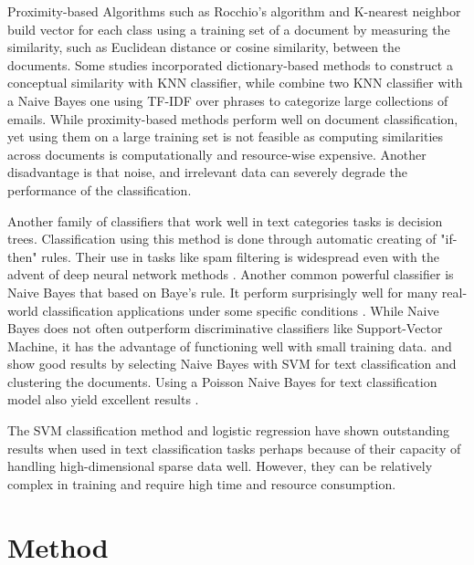 Proximity-based Algorithms such as Rocchio's algorithm \citep{rocchio1971relevance}  and K-nearest neighbor \citep{tam_comparative_2002} build vector for each class using a training set of a document by measuring the similarity, such as Euclidean distance or cosine similarity, between the documents. Some studies \citep{bang_hierarchical_2006} incorporated dictionary-based methods to construct a conceptual similarity with KNN classifier, while \citep{chang_using_2009} combine two KNN classifier with a Naive Bayes one using TF-IDF over phrases to categorize large collections of emails. While proximity-based methods perform well on document classification, yet using them on a large training set is not feasible as computing similarities across documents is computationally and resource-wise expensive. Another disadvantage is that noise, and irrelevant data can severely degrade the performance of the classification.

Another family of classifiers that work well in text categories tasks is decision trees. Classification using this method is done through automatic creating of "if-then" rules. Their use in tasks like spam filtering is widespread even with the advent of deep neural network methods \citep{wu_behavior-based_2009}. Another common powerful classifier is Naive Bayes that based on Baye's rule. It perform surprisingly well for many real-world classification applications under some specific conditions \citep{mccallum_comparison_nodate} \citep{rish_analysis_2001}. While Naive Bayes does not often outperform discriminative classifiers like Support-Vector Machine, it has the advantage of functioning well with small training data. \citep{kim_effective_2006} and \citep{isa_text_2008} show good results by selecting Naive Bayes with SVM for text classification and clustering the documents. Using a Poisson Naive Bayes for text classification model also yield excellent results \citep{isa_text_2008}.  
 
The SVM classification method and logistic regression have shown outstanding results when used in text classification tasks \citep{Yang1999ARO} \citep{brucher2002document} perhaps because of their capacity of handling high-dimensional sparse data well.  However, they can be relatively complex in training and require high time and resource consumption.



\section{Method}
\label{sec:logistic}

